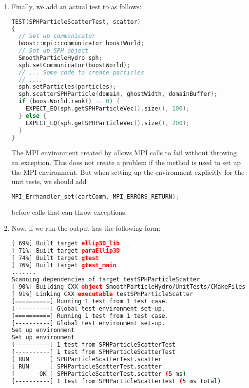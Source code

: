 \begin{enumerate}
         The tests in  are then run using 
         .  Note that this function returns from  
         and, therefore, and non-googletest environment objects created in main (e.g., 
         boost::mpi::environment) are deleted before the tests are run.

  \item Finally, we add an actual test to  as follows:
\begin{lstlisting}[language=Cpp]
TEST(SPHParticleScatterTest, scatter)
{
  // Set up communicator
  boost::mpi::communicator boostWorld;
  // Set up SPH object
  SmoothParticleHydro sph;
  sph.setCommunicator(boostWorld);
  // ... Some code to create particles
  // ....
  sph.setParticles(particles);
  sph.scatterSPHParticle(domain, ghostWidth, domainBuffer);
  if (boostWorld.rank() == 0) {
    EXPECT_EQ(sph.getSPHParticleVec().size(), 100);
  } else {
    EXPECT_EQ(sph.getSPHParticleVec().size(), 200);
  }
}
\end{lstlisting}
       \begin{NoteBox}
        The  MPI environment created by
         allows MPI calls to
        fail without throwing an exception.  This does not create a problem if
        the  method is used to set up the
        MPI environment.  But when setting up the environment explicitly for 
        the unit tests, we should add
\begin{lstlisting}[language=Cpp]
MPI_Errhandler_set(cartComm, MPI_ERRORS_RETURN);
\end{lstlisting}
        before calls that can throw exceptions.
       \end{NoteBox}

  \item Now, if we run  the output has the following form:
\begin{lstlisting}[language=sh, backgroundcolor=\color{background}]
[ 69%] Built target ellip3D_lib
[ 71%] Built target paraEllip3D
[ 74%] Built target gtest
[ 76%] Built target gtest_main
.......
Scanning dependencies of target testSPHParticleScatter
[ 90%] Building CXX object SmoothParticleHydro/UnitTests/CMakeFiles/testSPHParticleScatter.dir/testSPHParticleScatter.cpp.o
[ 91%] Linking CXX executable testSPHParticleScatter
[==========] Running 1 test from 1 test case.
[----------] Global test environment set-up.
[==========] Running 1 test from 1 test case.
[----------] Global test environment set-up.
Set up environment
Set up environment
[----------] 1 test from SPHParticleScatterTest
[----------] 1 test from SPHParticleScatterTest
[ RUN      ] SPHParticleScatterTest.scatter
[ RUN      ] SPHParticleScatterTest.scatter
[       OK ] SPHParticleScatterTest.scatter (5 ms)
[----------] 1 test from SPHParticleScatterTest (5 ms total)


\end{lstlisting}
\end{enumerate}
